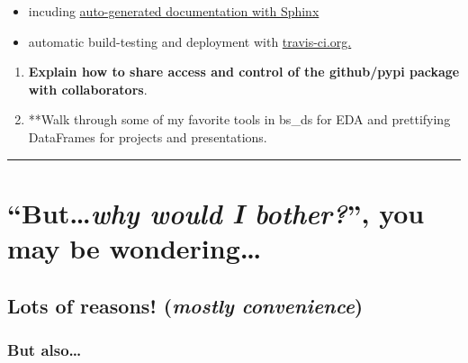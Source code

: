 \documentclass[11pt]{article}
\providecommand{\tightlist}{%
      \setlength{\itemsep}{0pt}\setlength{\parskip}{0pt}}
\begin{document}
\begin{itemize}
\tightlist
\item
  incuding \href{https://bs-ds.readthedocs.io/en/latest/}{auto-generated
  documentation with Sphinx}
\item
  automatic build-testing and deployment with
  \href{https://travis-ci.org/}{travis-ci.org.} 
\end{itemize}

\begin{enumerate}
\def\labelenumi{\arabic{enumi})}
\setcounter{enumi}{1}
\tightlist
\item
  \textbf{Explain how to share access and control of the github/pypi
  package with collaborators}. 
\item
  **Walk through some of my favorite tools in bs\_ds for EDA and
  prettifying DataFrames for projects and presentations.
\end{enumerate}

\begin{center}\rule{0.5\linewidth}{\linethickness}\end{center}

\hypertarget{butwhy-would-i-bother-you-may-be-wondering}{%
\section{\texorpdfstring{``But\ldots{}\emph{why would I bother?}'', you
may be
wondering\ldots{}}{``But\ldots{}why would I bother?'', you may be wondering\ldots{}}}\label{butwhy-would-i-bother-you-may-be-wondering}}

\hypertarget{lots-of-reasons-mostly-convenience}{%
\subsection{\texorpdfstring{\textbf{Lots of reasons!} (\emph{mostly
convenience})}{Lots of reasons! (mostly convenience)}}\label{lots-of-reasons-mostly-convenience}}

\hypertarget{but-also}{%
\subsubsection{But also\ldots{}}\label{but-also}}
\end{document}
